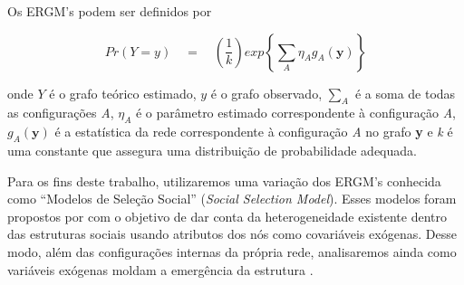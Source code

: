 \documentclass[a4paper, 12pt, openright, oneside, german, french, english, brazil]{abntex2}
\begin{document}
	
	
	Os ERGM's podem ser definidos por
	
	
	\begin{equation}
	Pr(Y=y) \quad = \quad \left(\frac{1}{k}\right) exp \left\{ \sum_{A} \eta_A g_A (\textbf{y}) \right\}
	\end{equation}
	
	onde $Y$ é o grafo teórico estimado, $y$ é o grafo observado, $\sum_{A}$ é a soma de todas as configurações \textit{A}, $\eta_A$ é o parâmetro estimado correspondente à configuração \textit{A}, $g_A(\textbf{y})$ é a estatística da rede correspondente à configuração \textit{A} no grafo \textbf{y} e \textit{k} é uma constante que assegura uma distribuição de probabilidade adequada\cite{robins2007introduction}. 
	
	
	
	Para os fins deste trabalho, utilizaremos uma variação dos ERGM's conhecida como ``Modelos de Seleção Social'' (\textit{Social Selection Model}). Esses modelos foram propostos por  com o objetivo de dar conta da heterogeneidade existente dentro das estruturas sociais usando atributos dos nós como covariáveis exógenas. Desse modo, além das configurações internas da própria rede, analisaremos ainda como variáveis exógenas moldam a emergência da estrutura \cite{wang2016social}.
	
\end{document}
